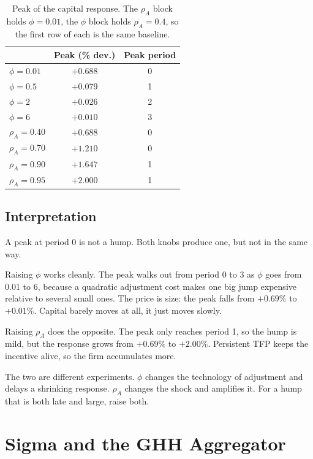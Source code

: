 \documentclass[11pt,a4paper]{article}
\begin{document}
\begin{table}[h]\centering
\begin{tabular}{lcc}
\toprule
 & Peak (\% dev.) & Peak period \\
\midrule
$\phi = 0.01$   & $+0.688$ & 0 \\
$\phi = 0.5$    & $+0.079$ & 1 \\
$\phi = 2$      & $+0.026$ & 2 \\
$\phi = 6$      & $+0.010$ & 3 \\
\midrule
$\rho_A = 0.40$ & $+0.688$ & 0 \\
$\rho_A = 0.70$ & $+1.210$ & 0 \\
$\rho_A = 0.90$ & $+1.647$ & 1 \\
$\rho_A = 0.95$ & $+2.000$ & 1 \\
\bottomrule
\end{tabular}
\caption{Peak of the capital response. The $\rho_A$ block holds
$\phi = 0.01$, the $\phi$ block holds $\rho_A = 0.4$, so the first row of each
is the same baseline.}
\end{table}

\subsection*{Interpretation}

A peak at period 0 is not a hump. Both knobs produce one, but not in the same
way.

Raising $\phi$ works cleanly. The peak walks out from period 0 to 3 as $\phi$
goes from 0.01 to 6, because a quadratic adjustment cost makes one big jump
expensive relative to several small ones. The price is size: the peak falls
from $+0.69\%$ to $+0.01\%$. Capital barely moves at all, it just moves slowly.

Raising $\rho_A$ does the opposite. The peak only reaches period 1, so the hump
is mild, but the response grows from $+0.69\%$ to $+2.00\%$. Persistent TFP
keeps the incentive alive, so the firm accumulates more.

The two are different experiments. $\phi$ changes the technology of adjustment
and delays a shrinking response. $\rho_A$ changes the shock and amplifies it.
For a hump that is both late and large, raise both.


\section{Sigma and the GHH Aggregator}
\end{document}
